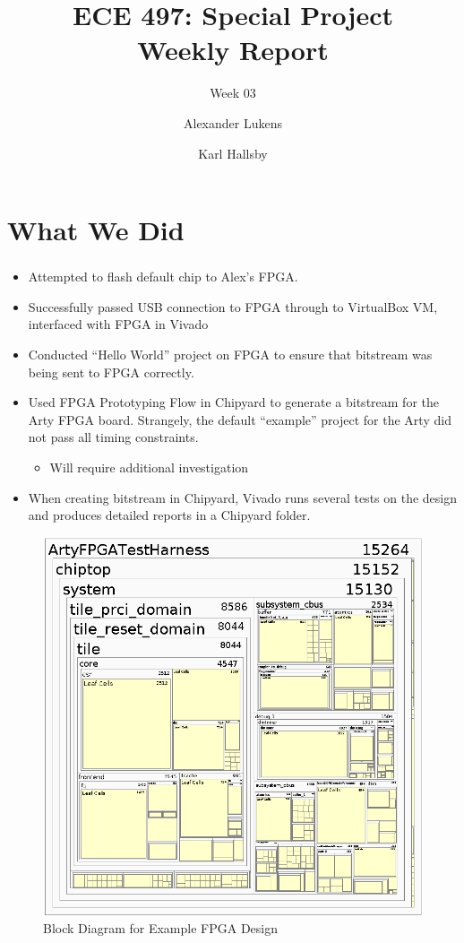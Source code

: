 \documentclass{../weeklyslides}
\title[Weekly Report]{ECE 497: Special Project \\ Weekly Report}
\subtitle{Week 03}
\author{Alexander Lukens \and Karl Hallsby}
\institute{Illinois Institute of Technology}
\date{\DTMdisplaydate{2021}{2}{11}{-1}}
\begin{document}
\nocite{chipyard}

\begin{frame}
  \titlepage{}
\end{frame}

\section{What We Did}\label{sec:What_We_Did}
\begin{frame}
  \frametitle{}
  \begin{itemize}
  \item Attempted to flash default chip to Alex's FPGA.\@
  \item Successfully passed USB connection to FPGA through to VirtualBox VM, interfaced with FPGA in Vivado
  \item Conducted ``Hello World'' project on FPGA to ensure that bitstream was being sent to FPGA correctly.
  \item Used FPGA Prototyping Flow in Chipyard to generate a bitstream for the Arty FPGA board.
    Strangely, the default ``example'' project for the Arty did not pass all timing constraints.
    \begin{itemize}
    \item Will require additional investigation
    \end{itemize}
  \item When creating bitstream in Chipyard, Vivado runs several tests on the design and produces detailed reports in a Chipyard folder.
  \end{itemize}
\end{frame}

\begin{frame}
  \begin{figure}[H]
    \centering
    \includegraphics[width=0.7\linewidth]{Synthesized_block_diagram}
    \caption{Block Diagram for Example FPGA Design}
    \label{fig:synthesizedblockdiagram}
  \end{figure}
\end{frame}
\end{document}
